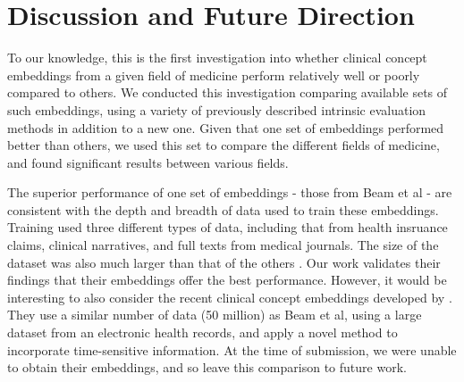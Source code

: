 \documentclass[11pt,a4paper]{article}
\def\blu#1{{\textbf{\color{blu}#1}}}
\def\ora#1{{\textbf{\color{ora}#1}}}
\begin{document}

\section{Discussion and Future Direction}
To our knowledge, this is the first investigation into whether clinical concept embeddings from a given field of medicine perform relatively well or poorly compared to others. We conducted this investigation comparing available sets of such embeddings, using a variety of previously described intrinsic evaluation methods in addition to a new one. Given that one set of embeddings performed better than others, we used this set to compare the different fields of medicine, and found significant results between various fields. 

The superior performance of one set of embeddings - those from Beam et al  - are consistent with the depth and breadth of data used to train these embeddings. Training used three different types of data, including that from health insruance claims, clinical narratives, and full texts from medical journals. The size of the dataset was also much larger than that of the others . Our work validates their findings that their embeddings offer the best performance. However, it would be interesting to also consider the recent clinical concept embeddings developed by \cite{xiangTimesensitiveClinicalConcept2019}. They use a similar number of data (50 million) as Beam et al, using a large dataset from an electronic health records, and apply a novel method to incorporate time-sensitive information. At the time of submission, we were unable to obtain their embeddings, and so leave this comparison to future work.
\end{document}
